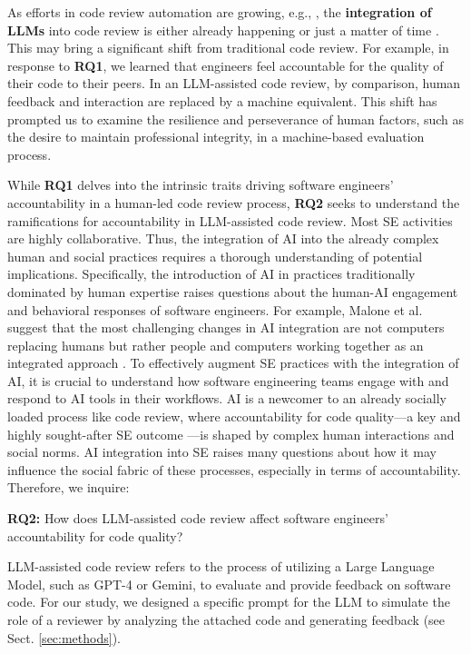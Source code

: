 As efforts in code review automation are growing, e.g., \cite{pandya2022corms,shi2019automatic}, the \textbf{integration of LLMs} into code review is either already happening \cite{lu2023llama,li2022automating} or just a matter of time \cite{lu2023llama}. This may bring a significant shift from traditional code review. For example, in response to \textbf{RQ1}, we learned that engineers feel accountable for the quality of their code to their peers. In an LLM-assisted code review, by comparison, human feedback and interaction are replaced by a machine equivalent. This shift has prompted us to examine the resilience and perseverance of human factors, such as the desire to maintain professional integrity, in a machine-based evaluation process. 

While \textbf{RQ1} delves into the intrinsic traits driving software engineers' accountability in a human-led code review process, \textbf{RQ2} seeks to understand the ramifications for accountability in LLM-assisted code review. Most SE activities are highly collaborative. Thus, the integration of AI into the already complex human and social practices requires a thorough understanding of potential implications. Specifically, the introduction of AI in practices traditionally dominated by human expertise raises questions about the human-AI engagement and behavioral responses of software engineers. For example, Malone et al. suggest that the most challenging changes in AI integration are not computers replacing humans but rather people and computers working together as an integrated approach \cite{malone2020artificial}. To effectively augment SE practices with the integration of AI, it is crucial to understand how software engineering teams engage with and respond to AI tools in their workflows. AI is a newcomer to an already socially loaded process like code review, where accountability for code quality---a key and highly sought-after SE outcome \citep{vasilescu2015quality,krasner2018,alami2022scrum}---is shaped by complex human interactions and social norms. AI integration into SE raises many questions about how it may influence the social fabric of these processes, especially in terms of accountability. Therefore, we inquire:

\medskip

    \noindent \textbf{RQ2:} How does LLM-assisted code review affect software engineers' accountability for code quality?
    
\medskip

LLM-assisted code review refers to the process of utilizing a Large Language Model, such as GPT-4 or Gemini, to evaluate and provide feedback on software code. For our study, we designed a specific prompt for the LLM to simulate the role of a reviewer by analyzing the attached code and generating feedback (see Sect. \ref{sec:methods}).

